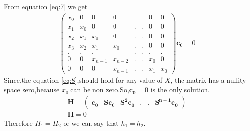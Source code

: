 \documentclass[journal,12pt,twocolumn]{IEEEtran}
\newcommand{\myvec}[1]{\ensuremath{\begin{pmatrix}#1\end{pmatrix}}}
\numberwithin{equation}{subsection}
\let\vec\mathbf
\begin{document}
From equation \eqref{eq:7} we get
\begin{align}
    \myvec{x_0 & 0 &0 &0 &.&.&0&0\\x_1&x_0&0&0&.&.&0&0\\x_2&x_1&x_0&0&.&.&0&0\\x_3&x_2&x_1&x_0&.&.&0&0\\.&.&.&.&.&.&.&.\\0&0&x_{n-1}&x_{n-2}&.&.&x_0&0\\0&0&0&x_{n-1}&.&.&x_1&x_0}\vec{c_0}=0\label{eq:8}
\end{align}
Since,the equation \eqref{eq:8},should hold for any value of $X$, the matrix has a nullity space zero,because $x_0$ can be non zero.So,$\vec{c_0}=0$ is the only solution.
\begin{align}
    \vec{H}=\myvec{\vec{c_0}&\vec{S}\vec{c_0}&\vec{S^2}\vec{c_0}&.&.&\vec{S^{n-1}}\vec{c_0}}\\
    \vec{H}=0
\end{align}
Therefore $H_1=H_2$ or we can say that $h_1=h_2$.
\end{document}
